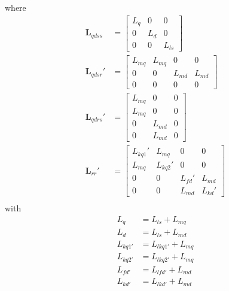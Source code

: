 %
where
%
\begin{align}
  \mathbf{L}_{qdss} &= 
  \begin{bmatrix}
    L_{q} & 0 & 0 \\
    0 & L_{d} & 0 \\
    0 & 0 & L_{ls}
  \end{bmatrix} \\
  \mathbf{L}_{qdsr}' &= 
  \begin{bmatrix}
    L_{mq} & L_{mq} & 0 & 0 \\
    0 & 0 & L_{md} & L_{md} \\
    0 & 0 & 0 & 0
  \end{bmatrix} \\
  \mathbf{L}_{qdrs}' &=
  \begin{bmatrix}
    L_{mq} & 0 & 0 \\
    L_{mq} & 0 & 0 \\
    0 & L_{md} & 0 \\
    0 & L_{md} & 0
  \end{bmatrix} \\
  \mathbf{L}_{rr}' &=
  \begin{bmatrix}
    L_{kq1}' & L_{mq} & 0 & 0 \\
    L_{mq} & L_{kq2}' & 0 & 0 \\
    0 & 0 & L_{fd}' & L_{md} \\
    0 & 0 & L_{md} & L_{kd}'
  \end{bmatrix} \\
\end{align}
%
with 
%
\begin{align}
  L_{q} &= L_{ls} + L_{mq} \\
  L_{d} &= L_{ls} + L_{md} \\
  L_{kq1'} &= L_{lkq1'} + L_{mq} \\
  L_{kq2'} &= L_{lkq2'} + L_{mq} \\
  L_{fd'} &= L_{lfd'} + L_{md} \\
  L_{kd'} &= L_{lkd'} + L_{md}
\end{align}

